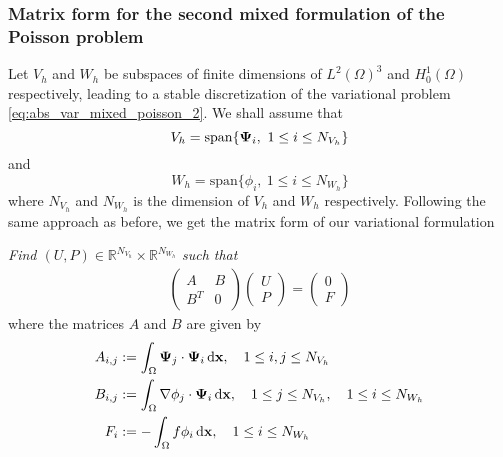\subsubsection*{Matrix form for the second mixed formulation of the Poisson problem}
%
Let $V_h$ and $W_h$ be subspaces of finite dimensions of $L^2(\Omega)^3$ and $H^1_0(\Omega)$ respectively, leading to a stable discretization of the variational problem \eqref{eq:abs_var_mixed_poisson_2}.
We shall assume that 
$$V_h = \mathrm{span}\{ \boldsymbol{\Psi}_{i}, ~ 1 \leq i \leq N_{V_h} \}$$ 
and
$$W_h = \mathrm{span}\{ \phi_{i}, ~ 1 \leq i \leq N_{W_h} \}$$ 
where $N_{V_h}$ and $N_{W_h}$ is the dimension of $V_h$ and $W_h$ respectively.
Following the same approach as before, we get the matrix form of our variational formulation
\begin{tcolorbox}
  {\em Find $(U,P) \in \mathbb{R}^{N_{V_h}} \times \mathbb{R}^{N_{W_h}}$ such that}
  \begin{align}
    \begin{pmatrix}
      A   & B \\
      B^T & 0 
    \end{pmatrix}
    \begin{pmatrix} U \\ P \end{pmatrix}
    = \begin{pmatrix} 0 \\ F \end{pmatrix}
  \end{align}
  where the matrices $A$ and $B$ are given by
  \begin{align*}
    A_{i, j} &:= \int_{\Omega} \boldsymbol{\Psi}_{j}\cdot \boldsymbol{\Psi}_{i} \,{\rm d} \mathbf{x}  
    ,  \quad 1 \leq i, j \leq N_{V_h}
    \\
    B_{i, j} &:= \int_{\Omega} \nabla \phi_{j} \cdot \boldsymbol{\Psi}_{i} \,{\rm d} \mathbf{x}  
    ,  \quad 1 \leq j \leq N_{V_h} 
    , \quad 1 \leq i \leq N_{W_h} 
    \\
    F_{i} &:= - \int_{\Omega} f \phi_{i} \,{\rm d} \mathbf{x} 
    , \quad 1 \leq i \leq N_{W_h} 
  \end{align*}
  \label{tcb:mixed_poisson_2}
\end{tcolorbox}

